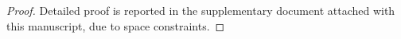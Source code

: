 \documentclass[lettersize,journal]{IEEEtran}
\newtheorem{proof}{Proof}
\begin{document}
\begin{proof}
Detailed proof is reported in the supplementary document attached with this manuscript, due to space constraints.











\end{proof}
\end{document}
